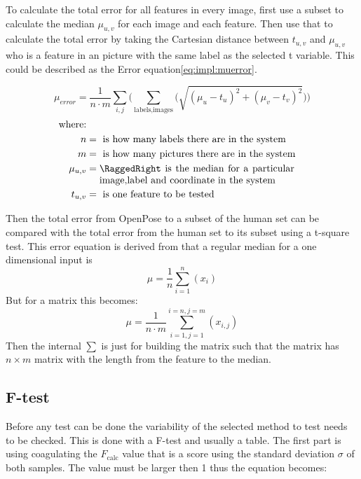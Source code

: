 \par

To calculate the total error for all features in every image, first use a subset to calculate the median \(\mu_{u,v}\) for each image and each feature.
Then use that to calculate the total error by taking the Cartesian distance between \(t_{u,v}\) and \(\mu_{u,v}\) who is a feature in an picture with the same label as the selected t variable.
This could be described as the Error equation\ref{eq:impl:muerror}.



\begin{equation}\label{eq:impl:muerror}
\mu_{error} = \frac{1}{n\cdot m} \sum_{i,j} \Bigg(\sum_{\text{labels},\text{images}} \bigg(\sqrt{(\mu_u - t_u)^2 + (\mu_v - t_v)^2 }\bigg)\Bigg)
\end{equation}
\begin{align*}
    \text{where:}\\
    n &= \text{ is how many labels there are in the system}\\
    m &= \text{ is how many pictures there are in the system}\\
    \mu_{u,v} &= \parbox[t]{7cm}{\RaggedRight is the median for a particular image,label and coordinate in the system}\\
    t_{u,v} &= \text{ is one feature to be tested}
\end{align*}
\par
Then the total error from OpenPose to a subset of the human set can be compared with the total error from the human set to its subset using a t-square test.
This error equation is derived from that a regular median for a one dimensional input is
\[
\mu = \frac{1}{n}\sum_{i=1}^n (x_i)
\]
But for a matrix this becomes:
\[
\mu = \frac{1}{n\cdot m} \sum_{i=1,j=1}^{i=n,j=m}(x_{i,j})
\]
Then the internal \(\sum\) is just for building the matrix such that the matrix has \(n\times m\) matrix with the length from the feature to the median.





\subsection{F-test}\label{sub:implemnt:ftest}
Before any test can be done the variability of the selected method to test needs to be checked.
This is done with a F-test and usually a table.
The first part is using coagulating the $F_{\text{calc}}$ value that is a score using the standard deviation $\sigma$ of both samples.
The value must be larger then 1 thus the equation becomes:

